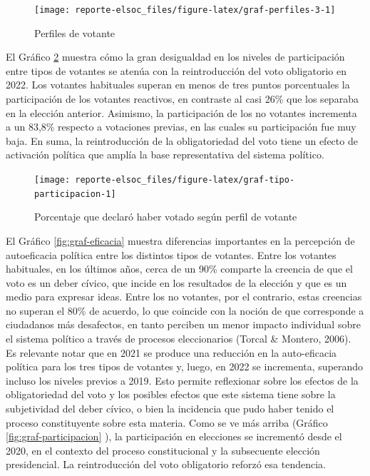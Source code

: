 \documentclass[
  12pt,
]{book}
\begin{document}
\begin{figure}

{\centering \texttt{[image: reporte-elsoc\_files/figure-latex/graf-perfiles-3-1]} 

}

\caption{Perfiles de votante}\label{fig:graf-perfiles-3}
\end{figure}

El Gráfico \ref{fig:graf-tipo-participacion} muestra cómo la gran desigualdad en los niveles de participación entre tipos de votantes se atenúa con la reintroducción del voto obligatorio en 2022. Los votantes habituales superan en menos de tres puntos porcentuales la participación de los votantes reactivos, en contraste al casi 26\% que los separaba en la elección anterior. Asimismo, la participación de los no votantes incrementa a un 83,8\% respecto a votaciones previas, en las cuales su participación fue muy baja. En suma, la reintroducción de la obligatoriedad del voto tiene un efecto de activación política que amplía la base representativa del sistema político.

\begin{figure}

{\centering \texttt{[image: reporte-elsoc\_files/figure-latex/graf-tipo-participacion-1]} 

}

\caption{Porcentaje que declaró haber votado según perfil de votante}\label{fig:graf-tipo-participacion}
\end{figure}

El Gráfico \ref{fig:graf-eficacia} muestra diferencias importantes en la percepción de autoeficacia política entre los distintos tipos de votantes. Entre los votantes habituales, en los últimos años, cerca de un 90\% comparte la creencia de que el voto es un deber cívico, que incide en los resultados de la elección y que es un medio para expresar ideas. Entre los no votantes, por el contrario, estas creencias no superan el 80\% de acuerdo, lo que coincide con la noción de que corresponde a ciudadanos más desafectos, en tanto perciben un menor impacto individual sobre el sistema político a través de procesos eleccionarios (Torcal \& Montero, 2006). Es relevante notar que en 2021 se produce una reducción en la auto-eficacia política para los tres tipos de votantes y, luego, en 2022 se incrementa, superando incluso los niveles previos a 2019. Esto permite reflexionar sobre los efectos de la obligatoriedad del voto y los posibles efectos que este sistema tiene sobre la subjetividad del deber cívico, o bien la incidencia que pudo haber tenido el proceso constituyente sobre esta materia. Como se ve más arriba (Gráfico \ref{fig:graf-participacion} ), la participación en elecciones se incrementó desde el 2020, en el contexto del proceso constitucional y la subsecuente elección presidencial. La reintroducción del voto obligatorio reforzó esa tendencia.
\end{document}
